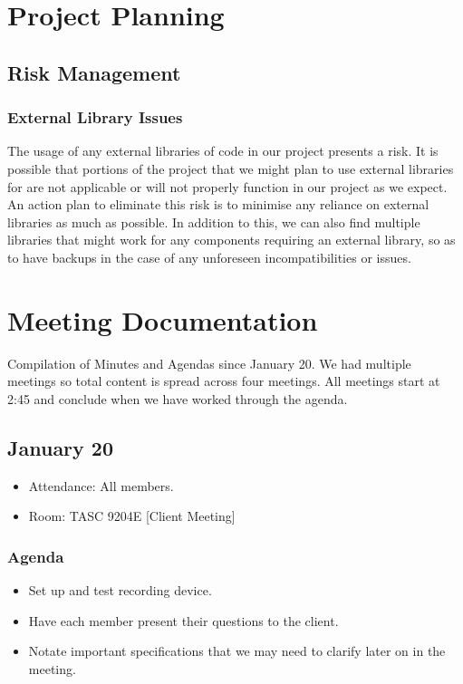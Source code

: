 \documentclass{article}
\begin{document}
\section{Project Planning}
\subsection{Risk Management}
\subsubsection{External Library Issues}
The usage of any external libraries of code in our project presents a risk. It is possible
that portions of the project that we might plan to use external libraries for are not 
applicable or will not properly function in our project as we expect.\\
An action plan to eliminate this risk is to minimise any reliance on external libraries as
much as possible. In addition to this, we can also find multiple libraries that might
work for any components requiring an external library, so as to have backups in
the case of any unforeseen incompatibilities or issues.

\section{Meeting Documentation}
Compilation of Minutes and Agendas since January 20.  We had multiple meetings
 so total content is spread across four meetings.  All meetings start at 2:45 
 and conclude when we have worked through the agenda.

\subsection{January 20}
\begin{itemize}
\item Attendance: All members.
\item Room: TASC 9204E [Client Meeting]
\end{itemize}
\subsubsection{Agenda}
\begin{itemize}
\item Set up and test recording device.
\item Have each member present their questions to the client.
\item Notate important specifications that we may need to clarify later on in
 the meeting.
\end{itemize}
\end{document}
